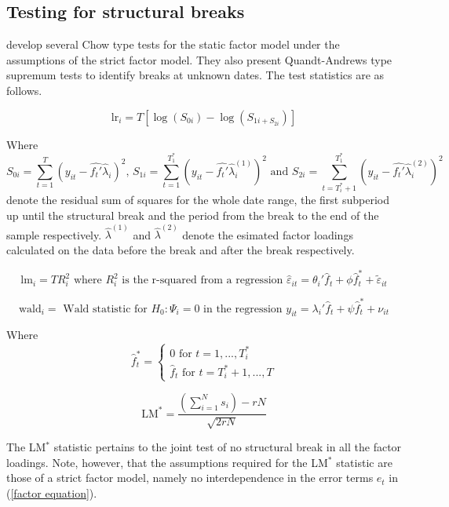 \documentclass[12pt]{article}
\begin{document}
\subsection{Testing for structural breaks}
\citet{breitung2011testing} develop several Chow type tests for the static factor model under the assumptions of the strict factor model. They also present Quandt-Andrews type supremum tests to identify breaks at unknown dates. The test statistics are as follows.


\begin{equation}
	\label{LR-Statistic}
	\text{lr}_i = T [ \log(S_{0i}) - \log(S_{1i + S_{2i}}) ]
\end{equation}

Where $$S_{0i} = \sum_{t=1}^{T}(y_{it} - \hat{f_t'} \hat \lambda_i)^2 \text{, } S_{1i} = \sum_{t=1}^{T_1^*}(y_{it} - \hat{f_t'} \hat \lambda_i^{(1)})^2 \text{ and } S_{2i} = \sum_{t=T^*_i+1}^{T_1^*}(y_{it} - \hat{f_t'} \hat \lambda_i^{(2)})^2 $$
denote the residual sum of squares for the whole date range, the first subperiod up until the structural break and the period from the break to the end of the sample respectively.
$\hat \lambda^{(1)}$ and $\hat \lambda^{(2)}$ denote the esimated factor loadings calculated on the data before the break and after the break respectively.

\begin{equation}
	\label{LM-Statistic}
	\text{lm}_i = T R^2_i \text{ where $R_i^2$ is the r-squared from a regression } \hat \varepsilon_{it} = \theta_i' \hat f_t + \phi \hat f_t^* + \tilde \varepsilon_{it}
\end{equation}

\begin{equation}
	\label{Wald-Statistic}
	\text{wald}_i = \text{ Wald statistic for $H_0: \Psi_i = 0$ in the regression } y_{it} = \lambda_i' \hat f_t + \psi \hat f_t^* + \nu_{it}
\end{equation}

Where 
$$\hat f_t^* = \begin{cases} 0 \text{ for } t=1, ..., T_i^* \\ \hat f_t \text{ for } t=T_i^*+1, ..., T \end{cases}$$

\begin{equation}
	\label{LM-Statistic}
	\text{LM}^* = \frac{\left( \sum_{i=1}^N s_i \right) -rN}{\sqrt{2rN}}
\end{equation}

The LM$^*$ statistic pertains to the joint test of no structural break in all the factor loadings. Note, however, that the assumptions required for the LM$^*$ statistic are those of a strict factor model, namely no interdependence in the error terms $e_t$ in (\ref{factor equation}).
\end{document}

